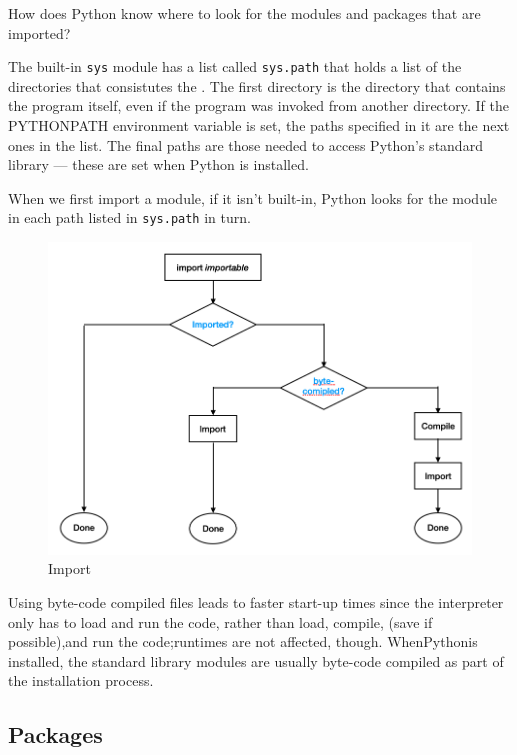 \begin{tcolorbox}
  How does Python know where to look for the modules and packages that are imported?

  The built-in \verb|sys| module has a list called \verb|sys.path| that holds a list of the directories that consistutes the .
  The first directory is the directory that contains the program itself, even if the program was invoked from another directory.
  If the PYTHONPATH environment variable is set, the paths specified in it are the next ones in the list.
  The final paths are those needed to access Python’s standard library --- these are set when Python is installed.

  When we first import a module, if it isn’t built-in, Python looks for the module in each path listed in \verb|sys.path| in turn. 
\end{tcolorbox}


\begin{figure}[!ht]
  \centering
  \includegraphics[width=\textwidth]{pics/import}
  \caption{Import}
\end{figure}


Using byte-code compiled files leads to faster start-up times since the interpreter only has to load and run the code, rather than load, compile, (save if possible),and run the code;runtimes are not affected, though.
WhenPythonis installed, the standard library modules are usually byte-code compiled as part of the installation process.


\subsection{Packages}

